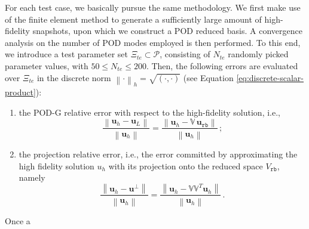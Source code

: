 \documentclass[12pt, a4paper, twoside, openright]{report}
\numberwithin{equation}{chapter}
\theoremstyle{theorem}
\theoremstyle{definition}
\theoremstyle{remark}
\theoremstyle{proposition}
\numberwithin{figure}{chapter}
\newcommand{\norm}[1]{\left\lVert#1\right\rVert}
\begin{document}
		For each test case, we basically pursue the same methodology. We first make use of the finite element method to generate a sufficiently large amount of high-fidelity snapshots, upon which we construct a POD reduced basis. A convergence analysis on the number of POD modes employed is then performed. To this end, we introduce a test parameter set $\Xi_{te} \subset \mathcal{P}$, consisting of $N_{te}$ randomly picked parameter values, with $50 \leq N_{te} \leq 200$. Then, the following errors are evaluated over $\Xi_{te}$ in the discrete norm $\norm{\cdot}_h = \sqrt{(\cdot,\cdot)}$ (see Equation \eqref{eq:discrete-scalar-product}):
		\begin{enumerate}[label=(\alph*)]
			\item the POD-G relative error with respect to the high-fidelity solution, i.e.,
			\begin{equation}
				\dfrac{\norm{\mathbf{u}_h - \mathbf{u}_L}}{\norm{\mathbf{u}_h}} = \dfrac{\norm{\mathbf{u}_h - \mathbb{V} \, \mathbf{u}_{\texttt{rb}}}}{\norm{\mathbf{u}_h}} \, ;
			\end{equation} 
			\item the projection relative error, i.e., the error committed by approximating the high fidelity solution $u_h$ with its projection onto the reduced space $V_{\texttt{rb}}$, namely
			\begin{equation}
				\dfrac{\norm{\mathbf{u}_h - \mathbf{u}^{\perp}}}{\norm{\mathbf{u}_h}} = \dfrac{\norm{\mathbf{u}_h - \mathbb{V} \mathbb{V}^T \mathbf{u}_h}}{\norm{\mathbf{u}_h}} \, .
			\end{equation}
		\end{enumerate}
		Once a 
		
\end{document}
